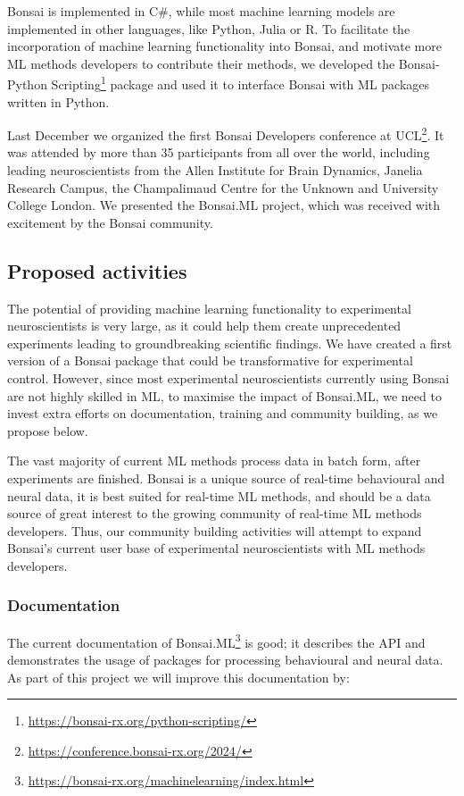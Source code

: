 Bonsai is implemented in C\#, while most machine learning models are
implemented in other languages, like Python, Julia or R.
%
To facilitate the incorporation of machine learning functionality into Bonsai,
and motivate more ML methods developers to contribute their methods, we
developed the Bonsai-Python
Scripting\footnote[6]{\url{https://bonsai-rx.org/python-scripting/}}
package and used it to interface Bonsai with ML packages written in Python.

Last December we organized the first Bonsai Developers conference at
UCL\footnote[7]{\url{https://conference.bonsai-rx.org/2024/}}. It was attended by more
than 35 participants from all over the world, including leading neuroscientists
from the Allen Institute for Brain Dynamics, Janelia Research Campus, the
Champalimaud Centre for the Unknown and University College London. We presented
the Bonsai.ML project, which was received with excitement by the Bonsai
community.

\subsection*{Proposed activities}

The potential of providing machine learning functionality to experimental
neuroscientists is very large, as it could help them create unprecedented
experiments leading to groundbreaking scientific findings.
%
We have created a first version of a Bonsai package that could be
transformative for experimental control.
%
However, since most experimental neuroscientists currently using Bonsai are not
highly skilled in ML, to maximise the impact of Bonsai.ML, we need to invest
extra efforts on documentation, training and community building, as we propose
below.

The vast majority of current ML methods process data in batch form, after
experiments are finished. Bonsai is a unique source of real-time behavioural and
neural data, it is best suited for real-time ML methods, and should be a data
source of great interest to the growing community of real-time ML methods
developers. Thus, our community building activities will attempt to expand
Bonsai's current user base of experimental neuroscientists with ML methods
developers.

\subsubsection*{Documentation}

The current documentation of
Bonsai.ML\footnote[8]{\url{https://bonsai-rx.org/machinelearning/index.html}}
is good; it describes the API and demonstrates the usage of packages for
processing behavioural and neural data. As part of this project we will improve
this documentation by:

